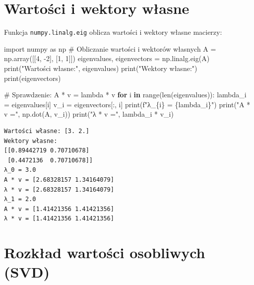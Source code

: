 \documentclass[
  letterpaper,
  DIV=11,
  numbers=noendperiod]{scrreprt}
\newenvironment{Shaded}{\begin{snugshade}}{\end{snugshade}}
\newcommand{\BuiltInTok}[1]{\textcolor[rgb]{0.00,0.23,0.31}{#1}}
\newcommand{\CommentTok}[1]{\textcolor[rgb]{0.37,0.37,0.37}{#1}}
\newcommand{\ControlFlowTok}[1]{\textcolor[rgb]{0.00,0.23,0.31}{\textbf{#1}}}
\newcommand{\DecValTok}[1]{\textcolor[rgb]{0.68,0.00,0.00}{#1}}
\newcommand{\ImportTok}[1]{\textcolor[rgb]{0.00,0.46,0.62}{#1}}
\newcommand{\KeywordTok}[1]{\textcolor[rgb]{0.00,0.23,0.31}{\textbf{#1}}}
\newcommand{\NormalTok}[1]{\textcolor[rgb]{0.00,0.23,0.31}{#1}}
\newcommand{\OperatorTok}[1]{\textcolor[rgb]{0.37,0.37,0.37}{#1}}
\newcommand{\SpecialCharTok}[1]{\textcolor[rgb]{0.37,0.37,0.37}{#1}}
\newcommand{\SpecialStringTok}[1]{\textcolor[rgb]{0.13,0.47,0.30}{#1}}
\newcommand{\StringTok}[1]{\textcolor[rgb]{0.13,0.47,0.30}{#1}}
\begin{document}
\section{Wartości i wektory
własne}\label{wartoux15bci-i-wektory-wux142asne}

Funkcja \texttt{numpy.linalg.eig} oblicza wartości i wektory własne
macierzy:

\begin{Shaded}
\begin{Highlighting}[]
\ImportTok{import}\NormalTok{ numpy }\ImportTok{as}\NormalTok{ np}
\CommentTok{\# Obliczanie wartości i wektorów własnych}
\NormalTok{A }\OperatorTok{=}\NormalTok{ np.array([[}\DecValTok{4}\NormalTok{, }\OperatorTok{{-}}\DecValTok{2}\NormalTok{], [}\DecValTok{1}\NormalTok{, }\DecValTok{1}\NormalTok{]])}
\NormalTok{eigenvalues, eigenvectors }\OperatorTok{=}\NormalTok{ np.linalg.eig(A)}
\BuiltInTok{print}\NormalTok{(}\StringTok{"Wartości własne:"}\NormalTok{, eigenvalues)}
\BuiltInTok{print}\NormalTok{(}\StringTok{"Wektory własne:"}\NormalTok{)}
\BuiltInTok{print}\NormalTok{(eigenvectors)}

\CommentTok{\# Sprawdzenie: A * v = lambda * v}
\ControlFlowTok{for}\NormalTok{ i }\KeywordTok{in} \BuiltInTok{range}\NormalTok{(}\BuiltInTok{len}\NormalTok{(eigenvalues)):}
\NormalTok{    lambda\_i }\OperatorTok{=}\NormalTok{ eigenvalues[i]}
\NormalTok{    v\_i }\OperatorTok{=}\NormalTok{ eigenvectors[:, i]}
    \BuiltInTok{print}\NormalTok{(}\SpecialStringTok{f"λ\_}\SpecialCharTok{\{}\NormalTok{i}\SpecialCharTok{\}}\SpecialStringTok{ = }\SpecialCharTok{\{}\NormalTok{lambda\_i}\SpecialCharTok{\}}\SpecialStringTok{"}\NormalTok{)}
    \BuiltInTok{print}\NormalTok{(}\StringTok{"A * v ="}\NormalTok{, np.dot(A, v\_i))}
    \BuiltInTok{print}\NormalTok{(}\StringTok{"λ * v ="}\NormalTok{, lambda\_i }\OperatorTok{*}\NormalTok{ v\_i)}
\end{Highlighting}
\end{Shaded}

\begin{verbatim}
Wartości własne: [3. 2.]
Wektory własne:
[[0.89442719 0.70710678]
 [0.4472136  0.70710678]]
λ_0 = 3.0
A * v = [2.68328157 1.34164079]
λ * v = [2.68328157 1.34164079]
λ_1 = 2.0
A * v = [1.41421356 1.41421356]
λ * v = [1.41421356 1.41421356]
\end{verbatim}

\section{Rozkład wartości osobliwych
(SVD)}\label{rozkux142ad-wartoux15bci-osobliwych-svd}
\end{document}
